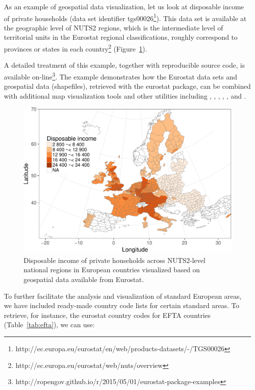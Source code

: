 As an example of geospatial data visualization, let us look at
disposable income of private households (data set identifier
tgs00026\footnote{http://ec.europa.eu/eurostat/en/web/products-datasets/-/TGS00026}). This
data set is available at the geographic level of NUTS2 regions, which
is the intermediate level of territorial units in the Eurostat
regional classifications, roughly correspond to provinces or states in
each country\footnote{http://ec.europa.eu/eurostat/web/nuts/overview}
(Figure~\ref{fig:mapexample}).

A detailed treatment of this example, together with reproducible
source code, is available
on-line\footnote{http://ropengov.github.io/r/2015/05/01/eurostat-package-examples}. The
example demonstrates how the Eurostat data sets and geospatial data
(shapefiles), retrieved with the eurostat package, can be combined
with additional map visualization tools and other utilities including
 \citep{grid},  \citep{maptools},  \citep{rgdal},
 \citep{rgeos},  \citep{scales}, and
 \citep{stringr}.


\begin{figure}
\begin{center}
\includegraphics{2015-manu-mapexample-1}
\caption{Disposable income of private households across NUTS2-level national regions in European countries visualized based on geospatial data available from Eurostat.}
\label{fig:mapexample}
\end{center}
\end{figure}


To further facilitate the analysis and visualization of standard
European areas, we have included ready-made country code lists for
certain standard areas. To retrieve, for instance, the eurostat
country codes for EFTA countries (Table~\ref{tab:efta}), we can use:

